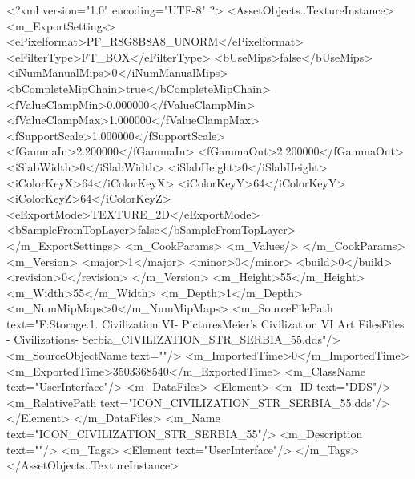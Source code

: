 <?xml version="1.0" encoding="UTF-8" ?>
<AssetObjects..TextureInstance>
	<m_ExportSettings>
		<ePixelformat>PF_R8G8B8A8_UNORM</ePixelformat>
		<eFilterType>FT_BOX</eFilterType>
		<bUseMips>false</bUseMips>
		<iNumManualMips>0</iNumManualMips>
		<bCompleteMipChain>true</bCompleteMipChain>
		<fValueClampMin>0.000000</fValueClampMin>
		<fValueClampMax>1.000000</fValueClampMax>
		<fSupportScale>1.000000</fSupportScale>
		<fGammaIn>2.200000</fGammaIn>
		<fGammaOut>2.200000</fGammaOut>
		<iSlabWidth>0</iSlabWidth>
		<iSlabHeight>0</iSlabHeight>
		<iColorKeyX>64</iColorKeyX>
		<iColorKeyY>64</iColorKeyY>
		<iColorKeyZ>64</iColorKeyZ>
		<eExportMode>TEXTURE_2D</eExportMode>
		<bSampleFromTopLayer>false</bSampleFromTopLayer>
	</m_ExportSettings>
	<m_CookParams>
		<m_Values/>
	</m_CookParams>
	<m_Version>
		<major>1</major>
		<minor>0</minor>
		<build>0</build>
		<revision>0</revision>
	</m_Version>
	<m_Height>55</m_Height>
	<m_Width>55</m_Width>
	<m_Depth>1</m_Depth>
	<m_NumMipMaps>0</m_NumMipMaps>
	<m_SourceFilePath text="F:\Mod Storage\2.1. Civilization VI\Mods\Archive - Pictures\Sid Meier's Civilization VI Art Files\Art Files - Civilizations\Civilization - Serbia\ICON_CIVILIZATION_STR_SERBIA_55.dds"/>
	<m_SourceObjectName text=""/>
	<m_ImportedTime>0</m_ImportedTime>
	<m_ExportedTime>3503368540</m_ExportedTime>
	<m_ClassName text="UserInterface"/>
	<m_DataFiles>
		<Element>
			<m_ID text="DDS"/>
			<m_RelativePath text="ICON_CIVILIZATION_STR_SERBIA_55.dds"/>
		</Element>
	</m_DataFiles>
	<m_Name text="ICON_CIVILIZATION_STR_SERBIA_55"/>
	<m_Description text=""/>
	<m_Tags>
		<Element text="UserInterface"/>
	</m_Tags>
</AssetObjects..TextureInstance>


